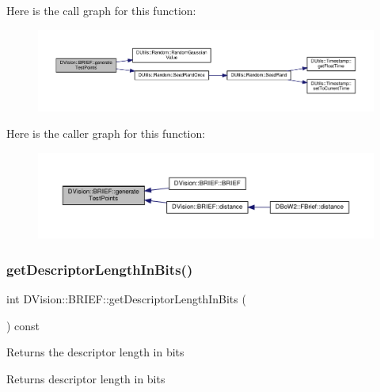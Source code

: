 Here is the call graph for this function\+:\nopagebreak
\begin{figure}[H]
\begin{center}
\leavevmode
\includegraphics[width=350pt]{classDVision_1_1BRIEF_a6daf52c01b9cbd845151077837870283_cgraph}
\end{center}
\end{figure}
Here is the caller graph for this function\+:\nopagebreak
\begin{figure}[H]
\begin{center}
\leavevmode
\includegraphics[width=350pt]{classDVision_1_1BRIEF_a6daf52c01b9cbd845151077837870283_icgraph}
\end{center}
\end{figure}
\mbox{\label{classDVision_1_1BRIEF_aa7679cb7d06344d75e4375baf779b84c}} 
\subsubsection{\texorpdfstring{get\+Descriptor\+Length\+In\+Bits()}{getDescriptorLengthInBits()}}
{\footnotesize\ttfamily int D\+Vision\+::\+B\+R\+I\+E\+F\+::get\+Descriptor\+Length\+In\+Bits (\begin{DoxyParamCaption}{ }\end{DoxyParamCaption}) const\hspace{0.3cm}{\ttfamily [inline]}}

Returns the descriptor length in bits \begin{DoxyReturn}{Returns}
descriptor length in bits 
\end{DoxyReturn}


